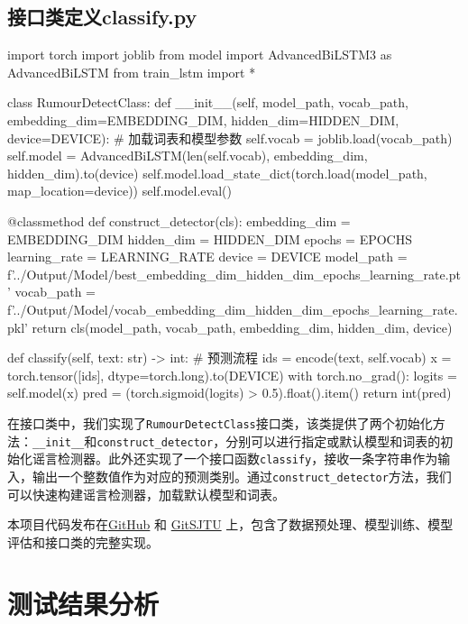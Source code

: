 \subsection{接口类定义classify.py}
\begin{codeblock}[language=Python]
import torch
import joblib
from model import AdvancedBiLSTM3 as AdvancedBiLSTM 
from train_lstm import *

class RumourDetectClass:
    def __init__(self, model_path, vocab_path, embedding_dim=EMBEDDING_DIM, hidden_dim=HIDDEN_DIM, device=DEVICE):
        # 加载词表和模型参数
        self.vocab = joblib.load(vocab_path)
        self.model = AdvancedBiLSTM(len(self.vocab), embedding_dim, hidden_dim).to(device)
        self.model.load_state_dict(torch.load(model_path, map_location=device))
        self.model.eval()

    @classmethod
    def construct_detector(cls):
        embedding_dim = EMBEDDING_DIM
        hidden_dim = HIDDEN_DIM
        epochs = EPOCHS
        learning_rate = LEARNING_RATE
        device = DEVICE
        model_path = f'../Output/Model/best_{embedding_dim}_{hidden_dim}_{epochs}_{learning_rate}.pt'
        vocab_path = f'../Output/Model/vocab_{embedding_dim}_{hidden_dim}_{epochs}_{learning_rate}.pkl'
        return cls(model_path, vocab_path, embedding_dim, hidden_dim, device)

    
    def classify(self, text: str) -> int:
        # 预测流程
        ids = encode(text, self.vocab)
        x = torch.tensor([ids], dtype=torch.long).to(DEVICE)
        with torch.no_grad():
            logits = self.model(x)
            pred = (torch.sigmoid(logits) > 0.5).float().item()
        return int(pred)
\end{codeblock}

在接口类中，我们实现了\verb|RumourDetectClass|接口类，该类提供了两个初始化方法：\verb|__init__|和\verb|construct_detector|，分别可以进行指定或默认模型和词表的初始化谣言检测器。此外还实现了一个接口函数\verb|classify|，接收一条字符串作为输入，输出一个整数值作为对应的预测类别。通过\verb|construct_detector|方法，我们可以快速构建谣言检测器，加载默认模型和词表。

\vspace{1em}
本项目代码发布在\href{https://github.com/youyeyejie/NIS4307_RumorDetect.git}{GitHub} 和 \href{https://git.sjtu.edu.cn/ma_yuezhao/nis4307_rumordetect}{GitSJTU} 上，包含了数据预处理、模型训练、模型评估和接口类的完整实现。

\newpage
\section{测试结果分析}

